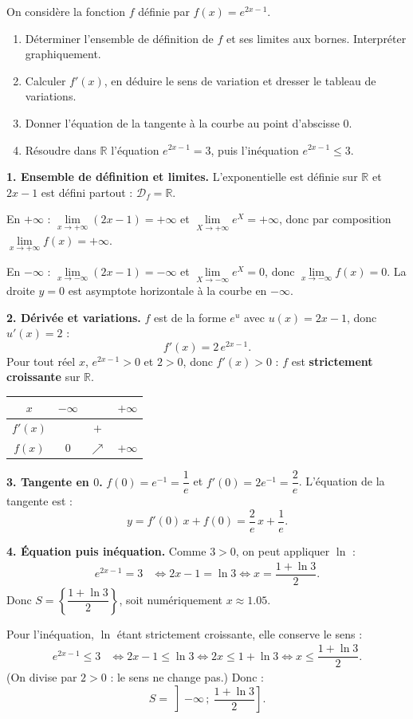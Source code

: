 \documentclass[11pt]{article}
\begin{document}
\begin{exoresolu}
On considère la fonction $f$ définie par $f(x) = e^{2x-1}$.
\begin{enumerate}
\item Déterminer l'ensemble de définition de $f$ et ses limites aux bornes. Interpréter graphiquement.
\item Calculer $f'(x)$, en déduire le sens de variation et dresser le tableau de variations.
\item Donner l'équation de la tangente à la courbe au point d'abscisse $0$.
\item Résoudre dans $\mathbb{R}$ l'équation $e^{2x-1} = 3$, puis l'inéquation $e^{2x-1} \leq 3$.
\end{enumerate}
\tcblower
\textbf{1. Ensemble de définition et limites.} L'exponentielle est définie sur $\mathbb{R}$ et $2x-1$ est défini partout : $\mathcal{D}_f = \mathbb{R}$.

En $+\infty$ : $\lim\limits_{x\to+\infty}(2x-1) = +\infty$ et $\lim\limits_{X\to+\infty} e^X = +\infty$, donc par composition $\lim\limits_{x\to+\infty} f(x) = +\infty$.

En $-\infty$ : $\lim\limits_{x\to-\infty}(2x-1) = -\infty$ et $\lim\limits_{X\to-\infty} e^X = 0$, donc $\lim\limits_{x\to-\infty} f(x) = 0$. La droite $y = 0$ est asymptote horizontale à la courbe en $-\infty$.

\textbf{2. Dérivée et variations.} $f$ est de la forme $e^u$ avec $u(x) = 2x-1$, donc $u'(x) = 2$ :
\[ f'(x) = 2\,e^{2x-1}. \]
Pour tout réel $x$, $e^{2x-1} > 0$ et $2 > 0$, donc $f'(x) > 0$ : $f$ est \textbf{strictement croissante} sur $\mathbb{R}$.

\begin{center}
\begin{tabular}{|c|ccc|}
\hline
$x$ & $-\infty$ & & $+\infty$ \\
\hline
$f'(x)$ & & $+$ & \\
\hline
$f(x)$ & $0$ & $\nearrow$ & $+\infty$ \\
\hline
\end{tabular}
\end{center}

\textbf{3. Tangente en $0$.} $f(0) = e^{-1} = \dfrac{1}{e}$ et $f'(0) = 2e^{-1} = \dfrac{2}{e}$. L'équation de la tangente est :
\[ y = f'(0)\,x + f(0) = \dfrac{2}{e}\,x + \dfrac{1}{e}. \]

\textbf{4. Équation puis inéquation.} Comme $3 > 0$, on peut appliquer $\ln$ :
\begin{align*}
e^{2x-1} = 3 &\iff 2x - 1 = \ln 3 \iff x = \dfrac{1 + \ln 3}{2}.
\end{align*}
Donc $S = \left\{\dfrac{1+\ln 3}{2}\right\}$, soit numériquement $x \approx \num{1,05}$.

Pour l'inéquation, $\ln$ étant strictement croissante, elle conserve le sens :
\begin{align*}
e^{2x-1} \leq 3 &\iff 2x - 1 \leq \ln 3 \iff 2x \leq 1 + \ln 3 \iff x \leq \dfrac{1+\ln 3}{2}.
\end{align*}
(On divise par $2 > 0$ : le sens ne change pas.) Donc :
\[ S = \left]-\infty\,;\ \dfrac{1+\ln 3}{2}\right]. \]
\end{exoresolu}
\end{document}
